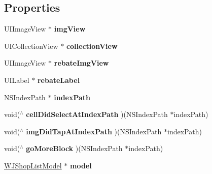 \subsection*{Properties}
\begin{DoxyCompactItemize}
\item 
\mbox{\label{interface_w_j_home_brand_cell_a5bbc7670859cdbbdaca1111bdb1ce67d}} 
U\+I\+Image\+View $\ast$ {\bfseries img\+View}
\item 
\mbox{\label{interface_w_j_home_brand_cell_abeeb807f067f9212e362c39acc66b127}} 
U\+I\+Collection\+View $\ast$ {\bfseries collection\+View}
\item 
\mbox{\label{interface_w_j_home_brand_cell_afb4f6167d1f7e0c9a6608ed1a2ce7efd}} 
U\+I\+Image\+View $\ast$ {\bfseries rebate\+Img\+View}
\item 
\mbox{\label{interface_w_j_home_brand_cell_ada8b3d631be0e167bc430b7a03697ad6}} 
U\+I\+Label $\ast$ {\bfseries rebate\+Label}
\item 
\mbox{\label{interface_w_j_home_brand_cell_a25a258ed8418797881840001b180ad95}} 
N\+S\+Index\+Path $\ast$ {\bfseries index\+Path}
\item 
\mbox{\label{interface_w_j_home_brand_cell_a5df04dd77bf4b8144b7c8c1245e6a218}} 
void($^\wedge$ {\bfseries cell\+Did\+Select\+At\+Index\+Path} )(N\+S\+Index\+Path $\ast$index\+Path)
\item 
\mbox{\label{interface_w_j_home_brand_cell_a57740b01ca6116987878dfe72d4bdaf0}} 
void($^\wedge$ {\bfseries img\+Did\+Tap\+At\+Index\+Path} )(N\+S\+Index\+Path $\ast$index\+Path)
\item 
\mbox{\label{interface_w_j_home_brand_cell_a0ad09bde088d8e14dbb148fbd5f906bb}} 
void($^\wedge$ {\bfseries go\+More\+Block} )(N\+S\+Index\+Path $\ast$index\+Path)
\item 
\mbox{\label{interface_w_j_home_brand_cell_a0f984de8e0acfc32c419a1f291bf0a28}} 
\mbox{\hyperlink{interface_w_j_shop_list_model}{W\+J\+Shop\+List\+Model}} $\ast$ {\bfseries model}
\end{DoxyCompactItemize}


